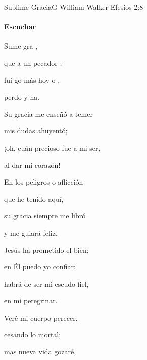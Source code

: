\documentclass[12pt, spanish]{book}
\begin{document}
    \begin{song}{Sublime Gracia}{G}
        {} %
        {William Walker}
        {Efesios 2:8} %
        {}
        \ifChordBk
        \paragraph{\mbox{}\hfill\protect\href{https://open.spotify.com/intl-es/track/28M3RasuK7Vjiujri1koHU}{Escuchar}\mbox{}\hfill}
        \fi

        \begin{SBOpGroup}
            Sume gra  ,

            que a un pecador ;

            fui go más hoy o ,

            perdo y   ha.
        \end{SBOpGroup}
        \vskip 20pt
        \begin{SBOpGroup}
            Su gracia me enseñó a temer

            mis dudas ahuyentó;

            ¡oh, cuán precioso fue a mi ser,

            al dar mi corazón!
        \end{SBOpGroup}
        \vskip 20pt
        \begin{SBOpGroup}
            En los peligros o aflicción

            que he tenido aquí,

            su gracia siempre me libró

            y me guiará feliz.
        \end{SBOpGroup}
        \vskip 20pt
        \begin{SBOpGroup}
            Jesús ha prometido el bien;

            en Él puedo yo confiar;

            habrá de ser mi escudo fiel,

            en mi peregrinar.
        \end{SBOpGroup}
        \vskip 20pt
        \begin{SBOpGroup}
            Veré mi cuerpo perecer,

            cesando lo mortal;

            mas nueva vida gozaré,


\end{SBOpGroup}
\end{song}
\end{document}
